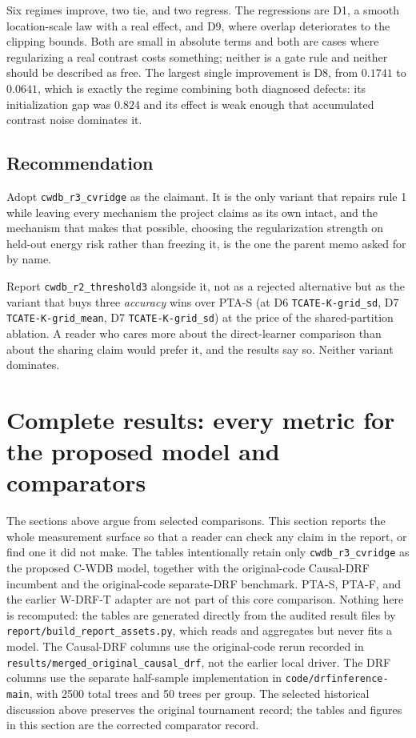 \documentclass[11pt,a4paper]{article}
\theoremstyle{definition}
\theoremstyle{remark}
\begin{document}
Six regimes improve, two tie, and two regress. The regressions are D1, a smooth
location-scale law with a real effect, and D9, where overlap deteriorates to the
clipping bounds. Both are small in absolute terms and both are cases where
regularizing a real contrast costs something; neither is a gate rule and neither
should be described as free. The largest single improvement is D8, from $0.1741$
to $0.0641$, which is exactly the regime combining both diagnosed defects: its
initialization gap was $0.824$ and its effect is weak enough that accumulated
contrast noise dominates it.

\subsection{Recommendation}

Adopt \texttt{cwdb\_r3\_cvridge} as the claimant. It is the only variant that
repairs rule 1 while leaving every mechanism the project claims as its own
intact, and the mechanism that makes that possible, choosing the regularization
strength on held-out energy risk rather than freezing it, is the one the parent
memo asked for by name.

Report \texttt{cwdb\_r2\_threshold3} alongside it, not as a rejected alternative
but as the variant that buys three \emph{accuracy} wins over PTA-S (at D6
\texttt{TCATE-K-grid\_sd}, D7 \texttt{TCATE-K-grid\_mean}, D7
\texttt{TCATE-K-grid\_sd}) at the price of the shared-partition ablation. A
reader who cares more about the direct-learner comparison than about the sharing
claim would prefer it, and the results say so. Neither variant dominates.


\clearpage
\section{Complete results: every metric for the proposed model and comparators}
\label{sec:complete}

The sections above argue from selected comparisons. This section reports the
whole measurement surface so that a reader can check any claim in the report, or
find one it did not make. The tables intentionally retain only
\texttt{cwdb\_r3\_cvridge} as the proposed C-WDB model, together with the
original-code Causal-DRF incumbent and the original-code separate-DRF benchmark.
PTA-S, PTA-F, and the earlier W-DRF-T adapter are not part of this core
comparison. Nothing here is recomputed: the tables are generated
directly from the audited result files by
\texttt{report/build\_report\_assets.py}, which reads and aggregates but never
fits a model. The Causal-DRF columns use the original-code rerun recorded in
\texttt{results/merged\_original\_causal\_drf}, not the earlier local driver.
The DRF columns use the separate half-sample implementation in
\texttt{code/drfinference-main}, with 2500 total trees and 50 trees per group.
The selected historical discussion above preserves the original tournament
record; the tables and figures in this section are the corrected comparator
record.
\end{document}
